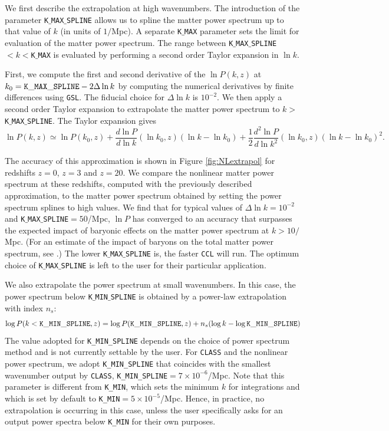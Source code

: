 \documentclass[\docopts]{\docclass}
\newcommand{\ccl}{{\tt CCL}\xspace}
\begin{document}
We first describe the extrapolation at high wavenumbers. The introduction of
the parameter {\tt K$\_$MAX$\_$SPLINE} allows us to spline the matter power
spectrum up to that value of $k$ (in units of $1/$Mpc). A separate {\tt K$\_$MAX}
parameter sets the limit for evaluation of the matter power spectrum. The range
between {\tt K$\_$MAX$\_$SPLINE}$<k<${\tt K$\_$MAX} is evaluated by performing
a second order Taylor expansion in $\ln k$.

First, we compute the first and second derivative of the $\ln P(k,z)$ at
$k_0={\rm \tt K\_MAX\_SPLINE}-2\Delta\ln k$ by computing the numerical
derivatives by finite differences using {\tt GSL}. The fiducial choice for
$\Delta\ln k$ is $10^{-2}$. We then apply a second order Taylor expansion to
extrapolate the matter power spectrum to $k>${\tt K$\_$MAX$\_$SPLINE}.
The Taylor expansion gives
%
\begin{equation}
  \ln P(k,z) \simeq \ln P(k_0,z) + \frac{d\ln P}{d\ln k}(\ln k_0,z) (\ln k-\ln k_0)  + \frac{1}{2}  \frac{d^2\ln P}{d\ln k^2}(\ln k_0,z) (\ln k-\ln k_0)^2.
  \label{eq:NLPSTaylor}
\end{equation}

The accuracy of this approximation is shown in Figure \ref{fig:NLextrapol} for
redshifts $z=0$, $z=3$ and $z=20$. We compare the nonlinear matter power
spectrum at these redshifts, computed with the previously described approximation,
to the matter power spectrum obtained by setting the power spectrum splines to
high values. We find that for typical values of $\Delta \ln k=10^{-2}$ and
{\tt K$\_$MAX$\_$SPLINE}$=50$/Mpc, $\ln P$ has converged to an accuracy that
surpasses the expected impact of baryonic effects on the matter power spectrum
at $k>10/$Mpc. (For an estimate of the impact of baryons on the total matter
power spectrum, see \citealt{Schneider15}.) The lower {\tt K$\_$MAX$\_$SPLINE}
is, the faster \ccl will run. The optimum choice of {\tt K$\_$MAX$\_$SPLINE} is
left to the user for their particular application.

We also extrapolate the power spectrum at small wavenumbers. In this case,
the power spectrum below {\tt K$\_$MIN$\_$SPLINE} is obtained by a power-law
extrapolation with index $n_s$:
\begin{equation}
  \log P(k<{\tt K\_MIN\_SPLINE},z) = \log P({\tt K\_MIN\_SPLINE},z) + n_s (\log k-\log{\tt K\_MIN\_SPLINE})
\end{equation}
The value adopted for {\tt K\_MIN\_SPLINE} depends on the choice of power
spectrum method and is not currently settable by the user. For {\tt CLASS} and
the nonlinear power spectrum, we adopt {\tt K\_MIN\_SPLINE} that coincides with
the smallest wavenumber output by {\tt CLASS}, {\tt K\_MIN\_SPLINE}$=7\times 10^{-6}$/Mpc.
Note that this parameter is different from {\tt K\_MIN}, which sets the minimum
$k$ for integrations and which is set by default to {\tt K\_MIN}$=5\times 10^{-5}$/Mpc.
Hence, in practice, no extrapolation is occurring in this case, unless the user
specifically asks for an output power spectra below {\tt K\_MIN} for their own purposes.
\end{document}
